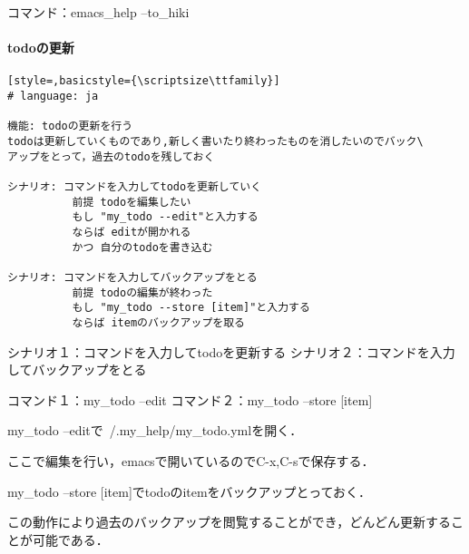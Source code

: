 コマンド：emacs\_help --to\_hiki

\paragraph{todoの更新}\begin{lstlisting}[style=,basicstyle={\scriptsize\ttfamily}]
# language: ja

機能: todoの更新を行う
todoは更新していくものであり,新しく書いたり終わったものを消したいのでバック\
アップをとって，過去のtodoを残しておく

シナリオ: コマンドを入力してtodoを更新していく
          前提 todoを編集したい
          もし "my_todo --edit"と入力する
          ならば editが開かれる
          かつ 自分のtodoを書き込む

シナリオ: コマンドを入力してバックアップをとる
          前提 todoの編集が終わった
          もし "my_todo --store [item]"と入力する
          ならば itemのバックアップを取る
\end{lstlisting}
シナリオ１：コマンドを入力してtodoを更新する
シナリオ２：コマンドを入力してバックアップをとる

コマンド１：my\_todo --edit
コマンド２：my\_todo --store [item]

my\_todo --editで~/.my\_help/my\_todo.ymlを開く．

ここで編集を行い，emacsで開いているのでC-x,C-sで保存する．

my\_todo --store [item]でtodoのitemをバックアップとっておく．

この動作により過去のバックアップを閲覧することができ，どんどん更新することが可能である．

